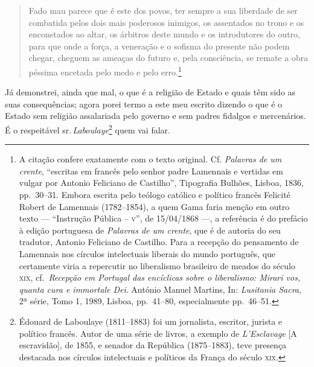 \begin{quote}
Fado mau parece que é este dos povos, ter sempre a sua liberdade de ser
combatida pelos dois mais poderosos inimigos, os assentados no trono e
os enconstados ao altar, os árbitros deste mundo e os introdutores do
outro, para que onde a força, a veneração e o sofisma do presente não
podem chegar, cheguem as ameaças do futuro e, pela consciência, se
remate a obra péssima encetada pelo medo e pelo erro.\footnote{A
  citação confere exatamente com o texto original. Cf. \emph{Palavras de
  um crente}, ``escritas em francês pelo senhor padre Lamennais e
  vertidas em vulgar por Antonio Feliciano de Castilho'', Tipografia
  Bulhões, Lisboa, 1836, pp.~30--31. Embora escrita pelo teólogo católico
  e político francês Felicité Robert de Lamennais (1782--1854), a quem
  Gama faria menção em outro texto --- ``Instrução Pública -- \textsc{v}'', de
  15/04/1868 ---, a referência é do prefácio à edição portuguesa de
  \emph{Palavras de um crente}, que é de autoria do seu tradutor,
  Antonio Feliciano de Castilho. Para a recepção do pensamento de
  Lamennais nos círculos intelectuais liberais do mundo português, que
  certamente viria a repercutir no liberalismo brasileiro de meados do
  século \textsc{xix}, cf.~\emph{Recepção em Portugal das encíclicas sobre o
  liberalismo: Mirari vos, quanta cura e immortale Dei}. António Manuel
  Martins, In: \emph{Lusitania Sacra}, 2ª série, Tomo 1, 1989, Lisboa,
  pp.~41--80, especialmente pp.~46--51.}
\end{quote}

Já demonstrei, ainda que mal, o que é a religião de Estado e quais têm
sido as suas consequências; agora porei termo a este meu escrito dizendo
o que é o Estado sem religião assalariada pelo governo e sem padres
fidalgos e mercenários. É o respeitável sr.\,\emph{Laboulaye}\footnote{
  Édouard de Laboulaye (1811--1883) foi um jornalista, escritor, jurista
  e político francês. Autor de uma série de livros, a exemplo de
  \emph{L'Esclavage} {[}A escravidão{]}, de 1855, e senador da
  República (1875--1883), teve presença destacada nos círculos
  intelectuais e políticos da França do século \textsc{xix}.} quem vai falar.

